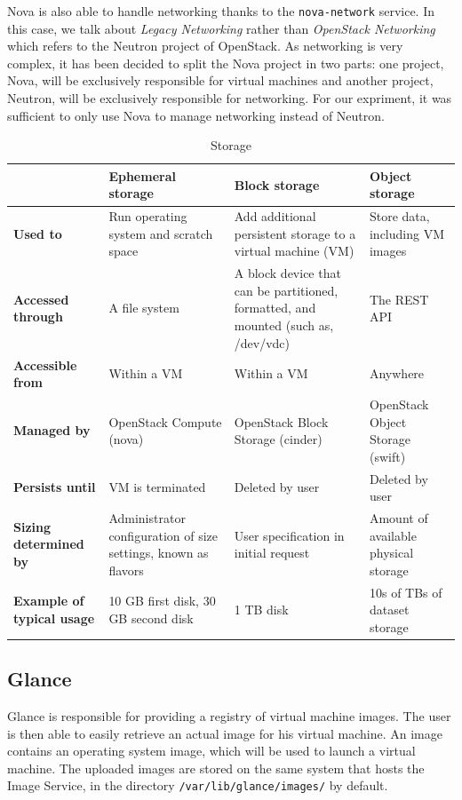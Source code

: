 Nova is also able to handle networking thanks to the \texttt{nova-network} service. 
In this case, we talk about \textit{Legacy Networking} rather than \textit{OpenStack Networking} which refers to the Neutron project of OpenStack. 
As networking is very complex, it has been decided to split the Nova project in two parts: one project, Nova, will be exclusively responsible for virtual machines and another project, Neutron, will be exclusively responsible for networking. 
For our expriment, it was sufficient to only use Nova to manage networking instead of Neutron.


\begin{table}[h]
	\centering
	\begin{tabular}{|m{2cm}|m{3.8cm}|m{3.8cm}|m{3.8cm}|}
		\hline
		 & 
		\textbf{Ephemeral \newline storage} & 
		\textbf{Block storage} & 
		\textbf{Object storage}\\
		\hline
		\textbf{Used to} & 
		Run operating system and scratch space & 
		Add additional persistent storage to a virtual machine (VM) & 
		Store data, including VM images \\
		\hline
		\textbf{Accessed through} & 
		A file system & 
		A block device that can be partitioned, formatted, and mounted (such as, /dev/vdc) & 
		The REST API \\
		\hline
		\textbf{Accessible from} & 
		Within a VM & 
		Within a VM & 
		Anywhere \\
		\hline
		\textbf{Managed by} & 
		OpenStack Compute (nova) & 
		OpenStack Block Storage (cinder) & 
		OpenStack Object Storage (swift) \\
		\hline
		\textbf{Persists until} & 
		VM is terminated & 
		Deleted by user & 
		Deleted by user \\
		\hline
		\textbf{Sizing determined by} & 
		Administrator configuration of size settings, known as flavors & 
		User specification in initial request & 
		Amount of available physical storage \\
		\hline
		\textbf{Example of typical usage} & 
		10 GB first disk, 30 GB second disk & 
		1 TB disk & 
		10s of TBs of dataset storage \\
		\hline
	\end{tabular}
	\caption{Storage \cite{stodec}}
	\label{table:storage_list}
\end{table}


\subsection{Glance}
Glance is responsible for providing a registry of virtual machine images. 
The user is then able to easily retrieve an actual image for his virtual machine. 
An image contains an operating system image, which will be used to launch a virtual machine. 
The uploaded images are stored on the same system that hosts the Image Service, in the directory \texttt{/var/lib/glance/images/} by default.

